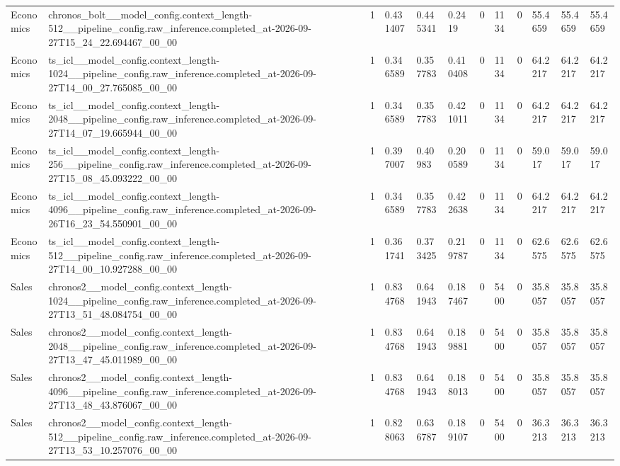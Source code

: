 \begin{tabular}{llllllllllll}
Economics & chronos\_bolt\_\_model\_config.context\_length-512\_\_pipeline\_config.raw\_inference.completed\_at-2026-09-27T15\_24\_22.694467\_00\_00 & 1 & 0.431407 & 0.445341 & 0.2419 & 0 & 1134 & 0 & 55.4659 & 55.4659 & 55.4659 \\
Economics & ts\_icl\_\_model\_config.context\_length-1024\_\_pipeline\_config.raw\_inference.completed\_at-2026-09-27T14\_00\_27.765085\_00\_00 & 1 & 0.346589 & 0.357783 & 0.410408 & 0 & 1134 & 0 & 64.2217 & 64.2217 & 64.2217 \\
Economics & ts\_icl\_\_model\_config.context\_length-2048\_\_pipeline\_config.raw\_inference.completed\_at-2026-09-27T14\_07\_19.665944\_00\_00 & 1 & 0.346589 & 0.357783 & 0.421011 & 0 & 1134 & 0 & 64.2217 & 64.2217 & 64.2217 \\
Economics & ts\_icl\_\_model\_config.context\_length-256\_\_pipeline\_config.raw\_inference.completed\_at-2026-09-27T15\_08\_45.093222\_00\_00 & 1 & 0.397007 & 0.40983 & 0.200589 & 0 & 1134 & 0 & 59.017 & 59.017 & 59.017 \\
Economics & ts\_icl\_\_model\_config.context\_length-4096\_\_pipeline\_config.raw\_inference.completed\_at-2026-09-26T16\_23\_54.550901\_00\_00 & 1 & 0.346589 & 0.357783 & 0.422638 & 0 & 1134 & 0 & 64.2217 & 64.2217 & 64.2217 \\
Economics & ts\_icl\_\_model\_config.context\_length-512\_\_pipeline\_config.raw\_inference.completed\_at-2026-09-27T14\_00\_10.927288\_00\_00 & 1 & 0.361741 & 0.373425 & 0.219787 & 0 & 1134 & 0 & 62.6575 & 62.6575 & 62.6575 \\
Sales & chronos2\_\_model\_config.context\_length-1024\_\_pipeline\_config.raw\_inference.completed\_at-2026-09-27T13\_51\_48.084754\_00\_00 & 1 & 0.834768 & 0.641943 & 0.187467 & 0 & 5400 & 0 & 35.8057 & 35.8057 & 35.8057 \\
Sales & chronos2\_\_model\_config.context\_length-2048\_\_pipeline\_config.raw\_inference.completed\_at-2026-09-27T13\_47\_45.011989\_00\_00 & 1 & 0.834768 & 0.641943 & 0.189881 & 0 & 5400 & 0 & 35.8057 & 35.8057 & 35.8057 \\
Sales & chronos2\_\_model\_config.context\_length-4096\_\_pipeline\_config.raw\_inference.completed\_at-2026-09-27T13\_48\_43.876067\_00\_00 & 1 & 0.834768 & 0.641943 & 0.188013 & 0 & 5400 & 0 & 35.8057 & 35.8057 & 35.8057 \\
Sales & chronos2\_\_model\_config.context\_length-512\_\_pipeline\_config.raw\_inference.completed\_at-2026-09-27T13\_53\_10.257076\_00\_00 & 1 & 0.828063 & 0.636787 & 0.189107 & 0 & 5400 & 0 & 36.3213 & 36.3213 & 36.3213 \\

\end{tabular}
